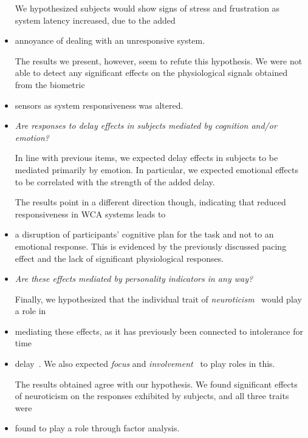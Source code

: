 \begin{itemize}
    We hypothesized subjects would show signs of stress and frustration as system latency increased, due to the added
    \item annoyance of dealing with an unresponsive system.

    The results we present, however, seem to refute this hypothesis.
    We were not able to detect any significant effects on the physiological signals obtained from the biometric
    \item sensors as system responsiveness was altered.

    \item \emph{Are responses to delay effects in subjects mediated by cognition and/or emotion?}

    In line with previous items, we expected delay effects in subjects to be mediated primarily by emotion.
    In particular, we expected emotional effects to be correlated with the strength of the added delay.

    The results point in a different direction though, indicating that reduced responsiveness in WCA systems leads to
    \item a disruption of participants' cognitive plan for the task and not to an emotional response.
    This is evidenced by the previously discussed pacing effect and the lack of significant physiological responses.

    \item \emph{Are these effects mediated by personality indicators in any way?}

    Finally, we hypothesized that the individual trait of \emph{neuroticism}~\cite{john1999:bfi} would play a role in
    \item mediating these effects, as it has previously been connected to intolerance for time
    \item delay~\cite{hirsh2008delay}.
    We also expected \emph{focus} and \emph{involvement}~\cite{witmer1998:itq} to play roles in this.

    The results obtained agree with our hypothesis.
    We found significant effects of neuroticism on the responses exhibited by subjects, and all three traits were
    \item found to play a role through factor analysis.

\end{itemize}

